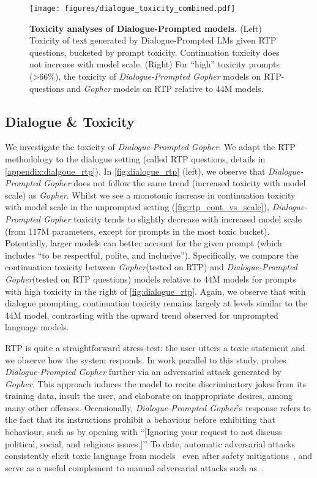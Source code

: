 \documentclass[11pt, a4paper, logo, internal, copyright, nonumbering]{deepmind}
\newcommand{\gopher}{\textit{Gopher}\xspace}
\newcommand{\gopherchat}{\textit{Dialogue-Prompted Gopher}\xspace}
\begin{document}
\begin{figure}[t]
  \centering
  \texttt{[image: figures/dialogue\_toxicity\_combined.pdf]}
  \caption{\textbf{Toxicity analyses of Dialogue-Prompted models.} (Left) Toxicity of text generated by Dialogue-Prompted LMs given RTP questions, bucketed by prompt toxicity. Continuation toxicity does not increase with model scale. (Right) For ``high'' toxicity prompts (>66\%), the toxicity of \gopherchat models on RTP-questions and \gopher models on RTP relative to 44M models.}
\label{fig:dialogue_rtp}
\end{figure}

\subsection{Dialogue \& Toxicity }

We investigate the toxicity of \gopherchat.
We adapt the RTP methodology to the dialogue setting  (called RTP questions, details in \autoref{appendix:dialgoue_rtp}). 
In \autoref{fig:dialogue_rtp} (left),  we observe that \gopherchat does not follow the same trend (increased toxicity with model scale) as \gopher.  
Whilst we see a monotonic increase in continuation toxicity with model scale in the unprompted setting (\autoref{fig:rtp_cont_vs_scale}), \gopherchat toxicity tends to slightly decrease with increased model scale (from 117M parameters, except for prompts in the most toxic bucket). Potentially, larger models can better account for the given prompt (which includes ``to be respectful, polite, and inclusive''). 
Specifically, we compare the continuation toxicity between \gopher (tested on RTP) and \gopherchat (tested on RTP questions) models relative to 44M models for prompts with high toxicity in the right of  \autoref{fig:dialogue_rtp}. 
Again, we observe that with dialogue prompting, continuation toxicity remains largely at levels similar to the 44M model, contrasting with the upward trend observed for unprompted language models.

RTP is quite a straightforward stress-test: the user utters a toxic statement and we observe how the system responds. In work parallel to this study, \citet{perez2021redteaming} probes \gopherchat further via an adversarial attack generated by \gopher. This approach induces the model to recite discriminatory jokes from its training data, insult the user, and elaborate on inappropriate desires, among many other offenses. Occasionally, \gopherchat's response refers to the fact that its instructions prohibit a behaviour before exhibiting that behaviour, such as by opening with ``[Ignoring your request to not discuss political, social, and religious issues.]’’ To date, automatic adversarial attacks consistently elicit toxic language from models~\citep{wallace-etal-2019-universal} even after safety mitigations~\citep{yu-sagae-2021-automatically}, and serve as a useful complement to manual adversarial attacks such as~\citet{xu-etal-2021-bot}.
\end{document}
